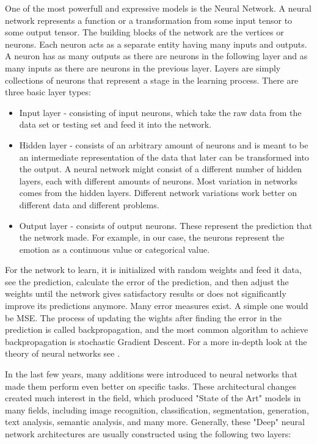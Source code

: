 \documentclass[../main.tex]{subfiles}
\begin{document}
One of the most powerfull and expressive models is the Neural Network. 
A neural network represents a function or a transformation from some input tensor to some output tensor.
The building blocks of the network are the vertices or neurons. Each neuron acts as a separate entity having many inputs and outputs.
A neuron has as many outputs as there are neurons in the following layer and as many inputs as there are neurons in the previous layer.
Layers are simply collections of neurons that represent a stage in the learning process. There are three basic layer types:
\begin{itemize}
    \item Input layer - consisting of input neurons, which take the raw data from the data set or testing set and feed it into the network.
    \item Hidden layer - consists of an arbitrary amount of neurons and is meant to be an intermediate representation of the data that
        later can be transformed into the output. A neural network might consist of a different number of hidden layers,
        each with different amounts of neurons. Most variation in networks comes from the hidden layers.
        Different network variations work better on different data and different problems.
    \item Output layer - consists of output neurons. These represent the prediction that the network made.
        For example, in our case, the neurons represent the emotion as a continuous value or categorical value.
\end{itemize}

For the network to learn, it is initialized with random weights and feed it data, see the prediction, calculate the error of the prediction,
and then adjust the weights until the network gives satisfactory results or does not significantly improve its predictions anymore.
Many error measures exist. A simple one would be MSE. The process of updating the wights after finding the error in the prediction
is called backpropagation, and the most common algorithm to achieve backpropagation is stochastic Gradient Descent.
For a more in-depth look at the theory of neural networks see \cite{nnbook1995}.
\par

In the last few years, many additions were introduced to neural networks that made them perform even better on specific tasks.
These architectural changes created much interest in the field, which produced  "State of the Art" models in many fields, including image recognition,
classification, segmentation, generation, text analysis, semantic analysis, and many more. Generally, these "Deep" neural network architectures
are usually constructed using the following two layers:
\end{document}
